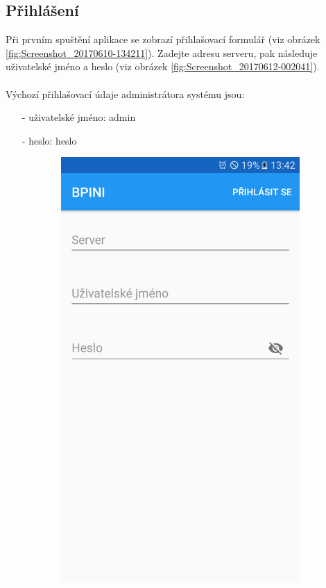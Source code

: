 \documentclass[czech,BP]{thesiskiv}
\begin{document}
\subsection{Přihlášení}	
Při prvním spuštění aplikace se zobrazí přihlašovací formulář (viz obrázek \ref{fig:Screenshot_20170610-134211}).
Zadejte adresu serveru, pak následuje uživatelské jméno a heslo (viz obrázek \ref{fig:Screenshot_20170612-002041}). 
\\\\
Výchozí přihlašovací údaje administrátora systému jsou:
\begin{itemize}[noitemsep]
\item [-] uživatelské jméno: admin
\item [-] heslo: heslo
\end{itemize}
\begin{figure}[H]
	\centering
  \begin{subfigure}[b]{0.3\textwidth}
    \centering
	\includegraphics[width=\textwidth]{../images/client_android/Screenshot_20170610-134211.png}	

\end{subfigure}
\end{figure}
\end{document}
